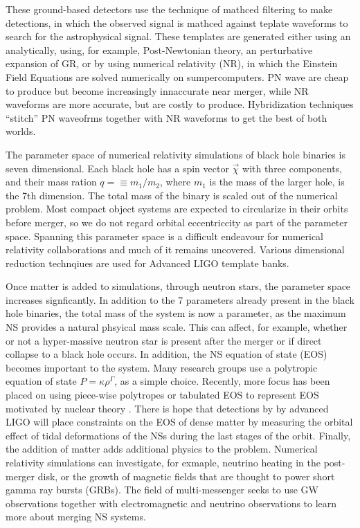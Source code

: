 These ground-based detectors use the technique of mathced filtering to make detections, in which the observed signal is mathced against teplate waveforms to search for the astrophysical signal. These templates are generated either using an analytically, using, for example, Post-Newtonian theory, an perturbative expansion of GR, or by using numerical relativity (NR), in which the Einstein Field Equations are solved numerically on sumpercomputers. PN wave are cheap to produce but become increasingly innaccurate near merger, while NR waveforms are more accurate, but are costly to produce. Hybridization techniques ``stitch'' PN waveofrms together with NR waveforms to get the best of both worlds.

The parameter space of numerical relativity simulations of black hole binaries is seven dimensional. Each black hole has a spin vector $\vec{\chi}$ with three components, and their mass ration $q=\equiv m_1/m_2$, where $m_1$ is the mass of the larger hole, is the 7th dimension. The total mass of the binary is scaled out of the numerical problem. Most compact object systems are expected to circularize in their orbits before merger, so we do not regard orbital eccentriccity as part of the parameter space. Spanning this parameter space is a difficult endeavour for numerical relativity collaborations and much of it remains uncovered. Various dimensional reduction technqiues are used for Advanced LIGO template banks. 

Once matter is added to simulations, through neutron stars, the parameter space increases signficantly. In addition to the 7 parameters already present in the black hole binaries, the total mass of the system is now a parameter, as the maximum NS provides a natural phsyical mass scale. This can affect, for example, whether or not a hyper-massive neutron star is present after the merger or if direct collapse to a black hole occurs. In addition, the NS equation of state (EOS) becomes important to the system. Many research groups use a polytropic equation of state $P=\kappa\rho^\Gamma$, as a simple choice. Recently, more focus has been placed on using piece-wise polytropes or tabulated EOS to represent EOS motivated by nuclear theory . There is hope that detections by by advanced LIGO will place constraints on the EOS of dense matter by measuring the orbital effect of tidal deformations of the NSs during the last stages of the orbit. Finally, the addition of matter adds additional physics to the problem. Numerical relativity simulations can investigate, for exmaple, neutrino heating in the post-merger disk, or the growth of magnetic fields that are thought to power short gamma ray bursts (GRBs). The field of multi-messenger seeks to use GW observations together with electromagnetic and neutrino observations to learn more about merging NS systems.

